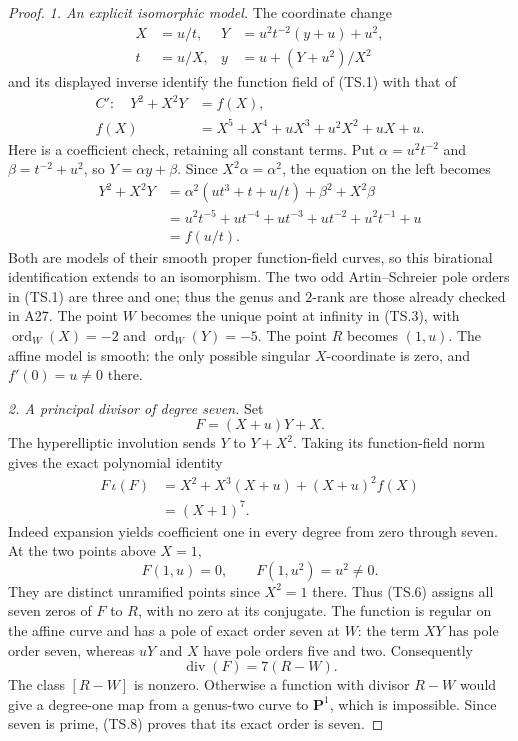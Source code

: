 \documentclass[11pt,a4paper]{article}
\begin{document}
\begin{proof}
\emph{1. An explicit isomorphic model.}
The coordinate change
\[
 \begin{aligned}
 X&=u/t, &
 Y&=u^2t^{-2}(y+u)+u^2,\\
 t&=u/X, &
 y&=u+(Y+u^2)/X^2
 \end{aligned}
 \tag{TS.2}
\]
and its displayed inverse identify the function field of (TS.1)
with that of
\[
 \begin{aligned}
 C':\quad Y^2+X^2Y&=f(X),\\
 f(X)&=X^5+X^4+uX^3+u^2X^2+uX+u.
 \end{aligned}
 \tag{TS.3}
\]
Here is a coefficient check, retaining all constant terms.
Put $\alpha=u^2t^{-2}$ and $\beta=t^{-2}+u^2$, so
$Y=\alpha y+\beta$.  Since $X^2\alpha=\alpha^2$,
the equation on the left becomes
\[
 \begin{aligned}
 Y^2+X^2Y
 &=\alpha^2(ut^3+t+u/t)+\beta^2+X^2\beta\\
 &=u^2t^{-5}+ut^{-4}+ut^{-3}
       +ut^{-2}+u^2t^{-1}+u\\
 &=f(u/t).
 \end{aligned}
 \tag{TS.4}
\]
Both are models of their smooth proper function-field curves, so
this birational identification extends to an isomorphism.
The two odd Artin--Schreier pole orders in (TS.1) are three and
one; thus the genus and $2$-rank are those already checked in A27.
The point $W$ becomes the unique point at infinity in (TS.3),
with $\operatorname{ord}_W(X)=-2$ and
$\operatorname{ord}_W(Y)=-5$.  The point $R$ becomes $(1,u)$.
The affine model is smooth: the only possible singular
$X$-coordinate is zero, and $f'(0)=u\ne0$ there.

\emph{2. A principal divisor of degree seven.}
Set
\[
                F=(X+u)Y+X.
 \tag{TS.5}
\]
The hyperelliptic involution sends $Y$ to $Y+X^2$.
Taking its function-field norm gives the exact polynomial identity
\[
 \begin{aligned}
 F\,\iota(F)
 &=X^2+X^3(X+u)+(X+u)^2f(X)\\
 &=(X+1)^7.
 \end{aligned}
 \tag{TS.6}
\]
Indeed expansion yields coefficient one in every degree from
zero through seven.  At the two points above $X=1$,
\[
       F(1,u)=0,\qquad F(1,u^2)=u^2\ne0.
 \tag{TS.7}
\]
They are distinct unramified points since $X^2=1$ there.
Thus (TS.6) assigns all seven zeros of $F$ to $R$, with no
zero at its conjugate.  The function is regular on the affine
curve and has a pole of exact order seven at $W$:
the term $XY$ has pole order seven, whereas $uY$ and $X$
have pole orders five and two.  Consequently
\[
                       \operatorname{div}(F)=7(R-W).
 \tag{TS.8}
\]
The class $[R-W]$ is nonzero.  Otherwise a function with divisor
$R-W$ would give a degree-one map from a genus-two curve to
$\mathbf P^1$, which is impossible.  Since seven is prime,
(TS.8) proves that its exact order is seven.


\end{proof}
\end{document}
